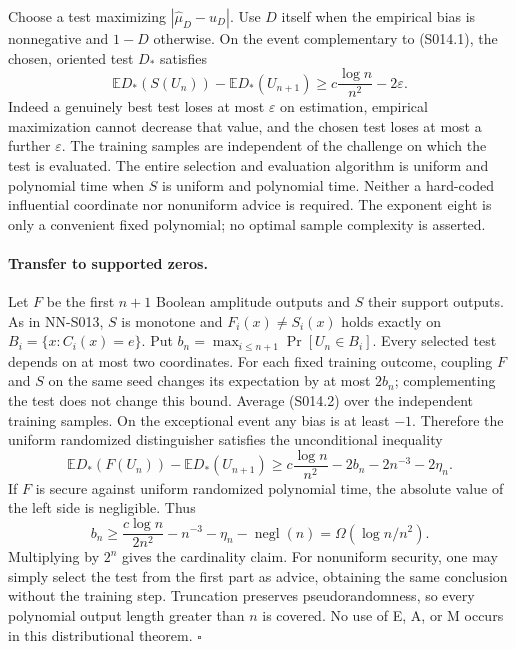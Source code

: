 Choose a test maximizing $|\widehat\mu_D-u_D|$. Use $D$ itself
when the empirical bias is nonnegative and $1-D$ otherwise.
On the event complementary to (S014.1), the chosen, oriented test
$D_*$ satisfies
\[
 \mathbb E D_*(S(U_n))-\mathbb E D_*(U_{n+1})
 \ge c\frac{\log n}{n^2}-2\varepsilon.           \tag{S014.2}
\]
Indeed a genuinely best test loses at most $\varepsilon$ on
estimation, empirical maximization cannot decrease that value,
and the chosen test loses at most a further $\varepsilon$.
The training samples are independent of the challenge on which
the test is evaluated. The entire selection and evaluation algorithm
is uniform and polynomial time when $S$ is uniform and polynomial time.
Neither a hard-coded influential coordinate nor nonuniform advice is
required. The exponent eight is only a convenient fixed polynomial;
no optimal sample complexity is asserted.

\paragraph{Transfer to supported zeros.}
Let $F$ be the first $n+1$ Boolean amplitude outputs and $S$ their
support outputs. As in NN-S013, $S$ is monotone and
$F_i(x)\ne S_i(x)$ holds exactly on
$B_i=\{x:C_i(x)=e\}$. Put
$b_n=\max_{i\le n+1}\Pr[U_n\in B_i]$.
Every selected test depends on at most two coordinates. For each fixed
training outcome, coupling $F$ and $S$ on the same seed changes its
expectation by at most $2b_n$; complementing the test does not change
this bound. Average (S014.2) over the independent training samples.
On the exceptional event any bias is at least $-1$. Therefore the
uniform randomized distinguisher satisfies the unconditional inequality
\[
 \mathbb E D_*(F(U_n))-\mathbb E D_*(U_{n+1})
 \ge c\frac{\log n}{n^2}-2b_n-2n^{-3}-2\eta_n.  \tag{S014.3}
\]
If $F$ is secure against uniform randomized polynomial time, the
absolute value of the left side is negligible. Thus
\[
 b_n\ge\frac{c\log n}{2n^2}-n^{-3}-\eta_n
                   -\operatorname{negl}(n)
      =\Omega(\log n/n^2).
\]
Multiplying by $2^n$ gives the cardinality claim. For nonuniform security,
one may simply select the test from the first part as advice, obtaining
the same conclusion without the training step. Truncation preserves
pseudorandomness, so every polynomial output length greater than $n$
is covered. No use of E, A, or M occurs in this distributional theorem.
\hfill$\square$

